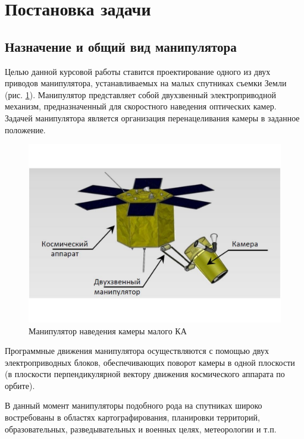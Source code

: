 \newpage
\section{Постановка задачи}
\subsection{Назначение и общий вид манипулятора}
Целью данной курсовой работы ставится проектирование одного из двух
приводов манипулятора, устанавливаемых на малых спутниках съемки Земли (рис. \ref{sattelite_general_view}).
Манипулятор представляет собой двухзвенный электроприводной механизм,
предназначенный для скоростного наведения оптических камер.
Задачей манипулятора является организация перенацеливания камеры в заданное положение.

\begin{figure}[h!]
    \centering
    \includegraphics[width=\textwidth, keepaspectratio, clip=true, trim=3cm 3cm 3cm 3cm]{./src/pictures/sattelite_3d_images/general_view}
    \caption{Манипулятор наведения камеры малого КА}
    \label{sattelite_general_view}
\end{figure}

Программные движения манипулятора осуществляются с помощью двух электроприводных блоков,
обеспечивающих поворот камеры в одной плоскости (в плоскости перпендикулярной
вектору движения космического аппарата по орбите).

В данный момент манипуляторы подобного рода на спутниках широко востребованы
в областях картографирования, планировки территорий, образовательных,
разведывательных и военных целях, метеорологии и т.п.


